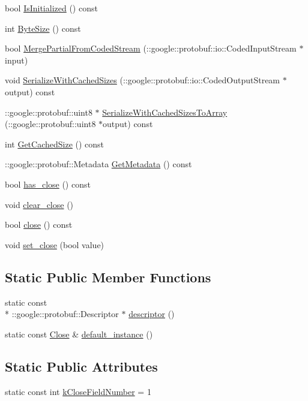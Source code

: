 \begin{DoxyCompactItemize}
\item 
bool \hyperlink{class_close_a5aebc81fadea648480666a41fe66c3cb}{Is\-Initialized} () const 
\item 
int \hyperlink{class_close_a2421ad573317a21c714c039851fa1220}{Byte\-Size} () const 
\item 
bool \hyperlink{class_close_a381c8ce094e6dc74a20400ccbfaea748}{Merge\-Partial\-From\-Coded\-Stream} (\-::google\-::protobuf\-::io\-::\-Coded\-Input\-Stream $\ast$input)
\item 
void \hyperlink{class_close_aeb282667ae1da2dd18c98d7ca711bd88}{Serialize\-With\-Cached\-Sizes} (\-::google\-::protobuf\-::io\-::\-Coded\-Output\-Stream $\ast$output) const 
\item 
\-::google\-::protobuf\-::uint8 $\ast$ \hyperlink{class_close_ac660e547b27cd984e526c0e248c69222}{Serialize\-With\-Cached\-Sizes\-To\-Array} (\-::google\-::protobuf\-::uint8 $\ast$output) const 
\item 
int \hyperlink{class_close_af8b2e8fb8ce9a11e24e63494656a6b28}{Get\-Cached\-Size} () const 
\item 
\-::google\-::protobuf\-::\-Metadata \hyperlink{class_close_a8ce129c6a94a5d6c4b664c6642d1d751}{Get\-Metadata} () const 
\item 
bool \hyperlink{class_close_ac85b7e010a254d4778e91d42fb95ff47}{has\-\_\-close} () const 
\item 
void \hyperlink{class_close_abf4dedd7abc99a939cd94219853b152d}{clear\-\_\-close} ()
\item 
bool \hyperlink{class_close_a300dbccf28dbbcbf9636f197d23bc44a}{close} () const 
\item 
void \hyperlink{class_close_a4557b1b27a9b4934714379e4797ba5c8}{set\-\_\-close} (bool value)
\end{DoxyCompactItemize}
\subsection*{Static Public Member Functions}
\begin{DoxyCompactItemize}
\item 
static const \\*
\-::google\-::protobuf\-::\-Descriptor $\ast$ \hyperlink{class_close_a42a5f68ed3c237f2d54319a4f8e1c5f5}{descriptor} ()
\item 
static const \hyperlink{class_close}{Close} \& \hyperlink{class_close_a90105787bd12a6ac106a06bb39b0b034}{default\-\_\-instance} ()
\end{DoxyCompactItemize}
\subsection*{Static Public Attributes}
\begin{DoxyCompactItemize}
\item 
static const int \hyperlink{class_close_ae10c316a91463074882301092a5c07b1}{k\-Close\-Field\-Number} = 1
\end{DoxyCompactItemize}
